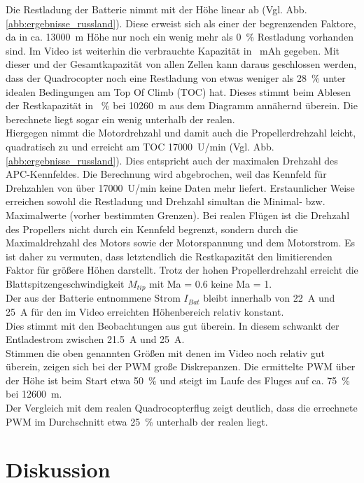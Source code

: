 Die Restladung der Batterie nimmt mit der Höhe linear ab (Vgl. Abb.\ref{abb:ergebnisse_russland}). Diese erweist sich als einer der begrenzenden Faktore, da in ca. \SI{13000}{m} Höhe nur noch ein wenig mehr als \SI{0}{\%} Restladung vorhanden sind. Im Video ist weiterhin die verbrauchte Kapazität in \SI{}{mAh} gegeben. Mit dieser und der Gesamtkapazität von allen Zellen kann daraus geschlossen werden, dass der Quadrocopter noch eine Restladung von etwas weniger als \SI{28}{\%} unter idealen Bedingungen am Top Of Climb (TOC) hat. Dieses stimmt beim Ablesen der Restkapazität in \SI{}{\%} bei \SI{10260}{m} aus dem Diagramm annähernd überein. Die berechnete liegt sogar ein wenig unterhalb der realen. \\
Hiergegen nimmt die Motordrehzahl und damit auch die Propellerdrehzahl leicht, quadratisch zu und erreicht am TOC \SI{17000}{U/min} (Vgl. Abb.\ref{abb:ergebnisse_russland}).  
Dies entspricht auch der maximalen Drehzahl des APC-Kennfeldes. Die Berechnung wird abgebrochen, weil das Kennfeld für Drehzahlen von über \SI{17000}{U/min} keine Daten mehr liefert. Erstaunlicher Weise erreichen sowohl die Restladung und Drehzahl simultan die Minimal- bzw. Maximalwerte (vorher bestimmten Grenzen). Bei realen Flügen ist die Drehzahl des Propellers nicht durch ein Kennfeld begrenzt, sondern durch die Maximaldrehzahl des Motors sowie der Motorspannung und dem Motorstrom. Es ist daher zu vermuten, dass letztendlich die Restkapazität den limitierenden Faktor für größere Höhen darstellt. Trotz der hohen Propellerdrehzahl erreicht die Blattspitzengeschwindigkeit \ensuremath{M_{tip}} mit Ma = 0.6 keine Ma = 1. \\
Der aus der Batterie entnommene Strom \ensuremath{I_{Bat}} bleibt innerhalb von \SI{22}{A} und \SI{25}{A} für den im Video erreichten Höhenbereich relativ konstant. \\
Dies stimmt mit den Beobachtungen aus \cite{Anderson.2018} gut überein. In diesem schwankt der Entladestrom zwischen \SI{21,5}{A} und \SI{25}{A}. \\
Stimmen die oben genannten Größen mit denen im Video noch relativ gut überein, zeigen sich bei der PWM große Diskrepanzen. Die ermittelte PWM über der Höhe ist beim Start etwa \SI{50}{\%} und steigt im Laufe des Fluges auf ca. \SI{75}{\%} bei \SI{12600}{m}. \\
Der Vergleich mit dem realen Quadrocopterflug zeigt deutlich, dass die errechnete PWM im Durchschnitt etwa \SI{25}{\%} unterhalb der realen liegt.


\section{Diskussion}
\label{sec:nachbildung_diskussion}

